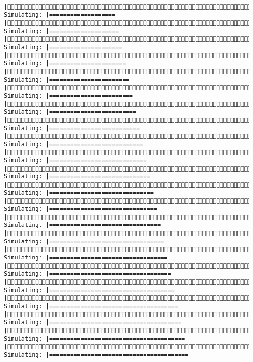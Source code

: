 \documentclass[]{article}
\begin{document}
\begin{verbatim}
     |(3/4) Simulating: |===================                                    |(3/4) Simulating: |====================                                   |(3/4) Simulating: |=====================                                  |(3/4) Simulating: |======================                                 |(3/4) Simulating: |=======================                                |(3/4) Simulating: |========================                               |(3/4) Simulating: |=========================                              |(3/4) Simulating: |==========================                             |(3/4) Simulating: |===========================                            |(3/4) Simulating: |============================                           |(3/4) Simulating: |=============================                          |(3/4) Simulating: |==============================                         |(3/4) Simulating: |===============================                        |(3/4) Simulating: |================================                       |(3/4) Simulating: |=================================                      |(3/4) Simulating: |==================================                     |(3/4) Simulating: |===================================                    |(3/4) Simulating: |====================================                   |(3/4) Simulating: |=====================================                  |(3/4) Simulating: |======================================                 |(3/4) Simulating: |=======================================                |(3/4) Simulating: |========================================               
\end{verbatim}
\end{document}
